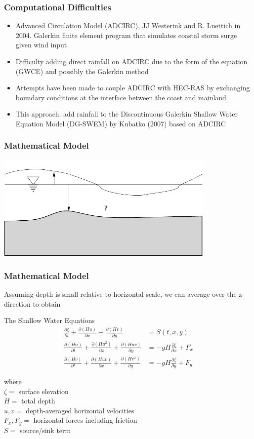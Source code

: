 \documentclass[10pt]{oden_beamer}
\newcommand\dt[1]{\frac{\partial #1}{\partial t}}
\newcommand\dx[1]{\frac{\partial #1}{\partial x}}
\newcommand\dy[1]{\frac{\partial #1}{\partial y}}
\begin{document}
\begin{frame}
  \frametitle{Computational Difficulties}
  \begin{itemize}
  \item Advanced Circulation Model (ADCIRC), JJ Westerink and R. Luettich in 2004. Galerkin finite element program that simulates coastal storm surge given wind input
  \item Difficulty adding direct rainfall on ADCIRC due to the form of the equation (GWCE) and possibly the Galerkin method
  \item Attempts have been made to couple ADCIRC with HEC-RAS by exchanging boundary conditions at the interface between the coast and mainland
  \item This approach: add rainfall to the Discontinuous Galerkin Shallow Water Equation Model (DG-SWEM) by Kubatko (2007) based on ADCIRC
  \end{itemize}
\end{frame}

\begin{frame}
  \frametitle{Mathematical Model}
  \centering
  \includegraphics[width=0.8\textwidth]{domain.pdf}
\end{frame}

\begin{frame}
  \frametitle{Mathematical Model}
  Assuming depth is small relative to horizontal scale, we can average over the z-direction to obtain
  \begin{block}{The Shallow Water Equations}
    \begin{align*}
      \dt{\zeta} + \dx{(Hu)} + \dy{(Hv)}  &= S(t,x,y) \\
      \dt{(Hu)} + \dx{(Hu^2)} + \dy{(Huv)} &= -gH\dx{\zeta} + F_x \\
      \dt{(Hv)} + \dx{(Huv)} + \dy{(Hv^2)} &= -gH\dy{\zeta} + F_y
    \end{align*}
  \end{block}
  where \\
  $\zeta =$ surface elevation \\
  $H = $ total depth \\
  $u,v = $ depth-averaged horizontal velocities \\
  $F_x,F_y = $ horizontal forces including friction \\
  $S = $ source/sink term
\end{frame}
\end{document}
